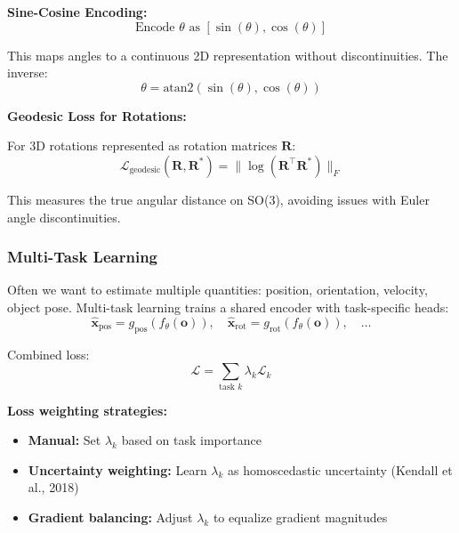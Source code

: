 \textbf{Sine-Cosine Encoding:}
\begin{equation}
\text{Encode } \theta \text{ as } [\sin(\theta), \cos(\theta)]
\label{eq:sincos_encoding}
\end{equation}

This maps angles to a continuous 2D representation without discontinuities. The inverse:
\begin{equation}
\theta = \text{atan2}(\sin(\theta), \cos(\theta))
\label{eq:sincos_decode}
\end{equation}

\textbf{Geodesic Loss for Rotations:}

For 3D rotations represented as rotation matrices $\mathbf{R}$:
\begin{equation}
\mathcal{L}_{\text{geodesic}}(\mathbf{R}, \mathbf{R}^*) = \| \log(\mathbf{R}^\top \mathbf{R}^*) \|_F
\label{eq:geodesic_loss}
\end{equation}

This measures the true angular distance on SO(3), avoiding issues with Euler angle discontinuities.

\subsubsection{Multi-Task Learning}

Often we want to estimate multiple quantities: position, orientation, velocity, object pose. Multi-task learning trains a shared encoder with task-specific heads:
\begin{equation}
\hat{\mathbf{x}}_{\text{pos}} = g_{\text{pos}}(f_\theta(\mathbf{o})), \quad \hat{\mathbf{x}}_{\text{rot}} = g_{\text{rot}}(f_\theta(\mathbf{o})), \quad \ldots
\label{eq:multitask}
\end{equation}

Combined loss:
\begin{equation}
\mathcal{L} = \sum_{\text{task } k} \lambda_k \mathcal{L}_k
\label{eq:multitask_loss}
\end{equation}

\textbf{Loss weighting strategies:}
\begin{itemize}
    \item \textbf{Manual:} Set $\lambda_k$ based on task importance
    \item \textbf{Uncertainty weighting:} Learn $\lambda_k$ as homoscedastic uncertainty (Kendall et al., 2018)
    \item \textbf{Gradient balancing:} Adjust $\lambda_k$ to equalize gradient magnitudes
\end{itemize}

